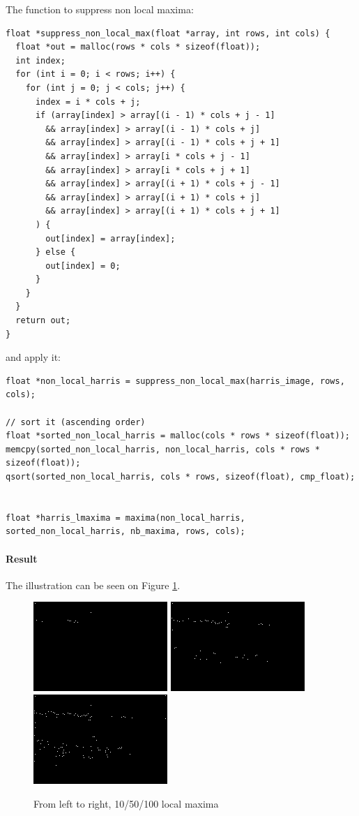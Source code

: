 \documentclass[a4paper, 10pt]{article}
\begin{document}
The function to suppress non local maxima:
\begin{lstlisting}[frame=single]
float *suppress_non_local_max(float *array, int rows, int cols) {
  float *out = malloc(rows * cols * sizeof(float));
  int index;
  for (int i = 0; i < rows; i++) {
    for (int j = 0; j < cols; j++) {
      index = i * cols + j;
      if (array[index] > array[(i - 1) * cols + j - 1]
        && array[index] > array[(i - 1) * cols + j]
        && array[index] > array[(i - 1) * cols + j + 1]
        && array[index] > array[i * cols + j - 1]
        && array[index] > array[i * cols + j + 1]
        && array[index] > array[(i + 1) * cols + j - 1]
        && array[index] > array[(i + 1) * cols + j]
        && array[index] > array[(i + 1) * cols + j + 1]
      ) {
        out[index] = array[index];
      } else {
        out[index] = 0;
      }
    }
  }
  return out;
}
\end{lstlisting}
and apply it:
\begin{lstlisting}[frame=single]
float *non_local_harris = suppress_non_local_max(harris_image, rows, cols);

// sort it (ascending order)
float *sorted_non_local_harris = malloc(cols * rows * sizeof(float));
memcpy(sorted_non_local_harris, non_local_harris, cols * rows * sizeof(float));
qsort(sorted_non_local_harris, cols * rows, sizeof(float), cmp_float);


float *harris_lmaxima = maxima(non_local_harris, sorted_non_local_harris, nb_maxima, rows, cols);
\end{lstlisting}

\paragraph{Result} The illustration can be seen on Figure \ref{fig-local}.
\begin{figure}[!htb]
\centering
\includegraphics[width=192px]{boat3x3_5_local_10.png}
\includegraphics[width=192px]{boat3x3_5_local_50.png}
\includegraphics[width=192px]{boat3x3_5_local_100.png}
\caption{From left to right, 10/50/100 local maxima}
\label{fig-local}
\end{figure}
\end{document}
